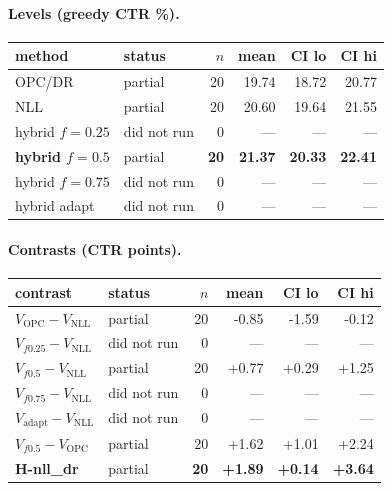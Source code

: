 \documentclass[10pt,a4paper]{article}
\begin{document}
\paragraph{Levels (greedy CTR \%).}
{\centering\small\begin{tabular}{llrrrr}
\toprule method & status & $n$ & mean & CI lo & CI hi \\
\midrule
OPC/DR & partial & 20 & 19.74 & 18.72 & 20.77 \\
NLL & partial & 20 & 20.60 & 19.64 & 21.55 \\
hybrid $f{=}0.25$ & did not run & 0 & --- & --- & --- \\
\textbf{hybrid $f{=}0.5$} & partial & \textbf{20} & \textbf{21.37} & \textbf{20.33} & \textbf{22.41} \\
hybrid $f{=}0.75$ & did not run & 0 & --- & --- & --- \\
hybrid adapt & did not run & 0 & --- & --- & --- \\
\bottomrule\end{tabular}\par}
\paragraph{Contrasts (CTR points).}
{\centering\small\begin{tabular}{llrrrr}
\toprule contrast & status & $n$ & mean & CI lo & CI hi \\
\midrule
$V_{\mathrm{OPC}}-V_{\mathrm{NLL}}$ & partial & 20 & -0.85 & -1.59 & -0.12 \\
$V_{f0.25}-V_{\mathrm{NLL}}$ & did not run & 0 & --- & --- & --- \\
$V_{f0.5}-V_{\mathrm{NLL}}$ & partial & 20 & +0.77 & +0.29 & +1.25 \\
$V_{f0.75}-V_{\mathrm{NLL}}$ & did not run & 0 & --- & --- & --- \\
$V_{\mathrm{adapt}}-V_{\mathrm{NLL}}$ & did not run & 0 & --- & --- & --- \\
$V_{f0.5}-V_{\mathrm{OPC}}$ & partial & 20 & +1.62 & +1.01 & +2.24 \\
\textbf{H-nll\_dr} & partial & \textbf{20} & \textbf{+1.89} & \textbf{+0.14} & \textbf{+3.64} \\
\bottomrule\end{tabular}\par}
\end{document}
